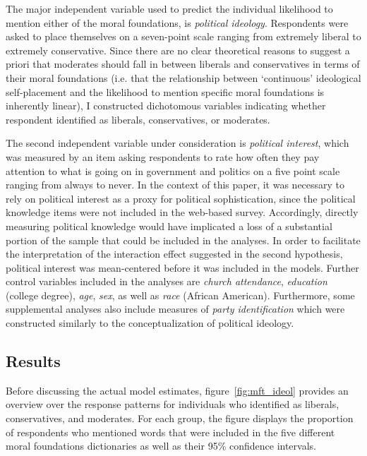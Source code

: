 \documentclass[12pt]{article}
\begin{document}
The major independent variable used to predict the individual likelihood to mention either of the moral foundations, is \textit{political ideology}. Respondents were asked to place themselves on a seven-point scale ranging from extremely liberal to extremely conservative. Since there are no clear theoretical reasons to suggest a priori that moderates should fall in between liberals and conservatives in terms of their moral foundations (i.e. that the relationship between `continuous' ideological self-placement and the likelihood to mention specific moral foundations is inherently linear), I constructed dichotomous variables indicating whether respondent identified as liberals, conservatives, or moderates.

The second independent variable under consideration is \textit{political interest}, which was measured by an item asking respondents to rate how often they pay attention to what is going on in government and politics on a five point scale ranging from always to never. In the context of this paper, it was necessary to rely on political interest as a proxy for political sophistication, since the political knowledge items were not included in the web-based survey. Accordingly, directly measuring political knowledge would have implicated a loss of a substantial portion of the sample that could be included in the analyses. In order to facilitate the interpretation of the interaction effect suggested in the second hypothesis, political interest was mean-centered before it was included in the models. Further control variables included in the analyses are \textit{church attendance}, \textit{education} (college degree), \textit{age}, \textit{sex}, as well as \textit{race} (African American). Furthermore, some supplemental analyses also include measures of \textit{party identification} which were constructed similarly to the conceptualization of political ideology.


\subsection{Results}

Before discussing the actual model estimates, figure~\ref{fig:mft_ideol} provides an overview over the response patterns for individuals who identified as liberals, conservatives, and moderates. For each group, the figure displays the proportion of respondents who mentioned words that were included in the five different moral foundations dictionaries as well as their 95\% confidence intervals.
\end{document}

